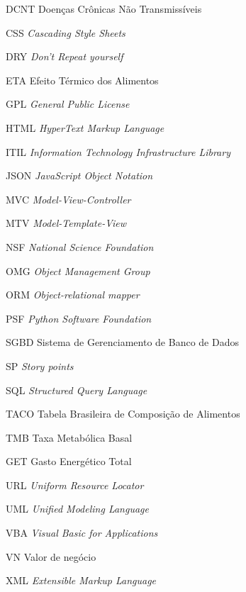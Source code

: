 \documentclass[
	12pt,				%
    oneside,			%
	a4paper,			%
	english,			%
	french,				%
	spanish,			%
	brazil,				%
	]{abntex2}
\begin{document}

\listoffigures* %
\cleardoublepage %


\listoftables*
\cleardoublepage


\begin{siglas}
	\item[DCNT] Doenças Crônicas Não Transmissíveis
 	\item[CSS] \textit{Cascading Style Sheets}
	\item[DRY] \textit{Don’t Repeat yourself}
	\item[ETA] Efeito Térmico dos Alimentos
	\item[GPL] \textit{General Public License}
	\item[HTML] \textit{HyperText Markup Language}
	\item[ITIL] \textit{Information Technology Infrastructure Library}
	\item[JSON] \textit{JavaScript Object Notation}
	\item[MVC] \textit{Model-View-Controller}
	\item[MTV] \textit{Model-Template-View}
	\item[NSF] \textit{National Science Foundation}
	\item[OMG] \textit{Object Management Group}
	\item[ORM] \textit{Object-relational mapper}
	\item[PSF] \textit{Python Software Foundation}
	\item[SGBD] Sistema de Gerenciamento de Banco de Dados
	\item[SP] \textit{Story points}
	\item[SQL] \textit{Structured Query Language}
	\item[TACO] Tabela Brasileira de Composição de Alimentos
	\item[TMB] Taxa Metabólica Basal
	\item[GET] Gasto Energético Total
	\item[URL] \textit{Uniform Resource Locator}
	\item[UML] \textit{Unified Modeling Language}
	\item[VBA] \textit{Visual Basic for Applications}
	\item[VN] Valor de negócio
	\item[XML] \textit{Extensible Markup Language}
\end{siglas}
\end{document}
